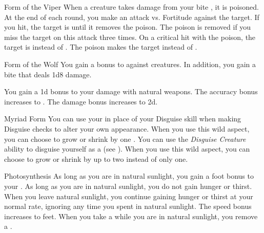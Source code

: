 {\begin{freeability}{Form of the Viper}
                \rankline
                 When a creature takes damage from your bite , it is poisoned.
                At the end of each round, you make an attack vs. Fortitude against the target.
                If you hit, the target is  until it removes the poison.
                The poison is removed if you miss the target on this attack three times.
                 On a critical hit with the poison, the target is  instead of .
                 The poison makes the target  instead of .
            \end{freeability}

            \begin{freeability}{Form of the Wolf}
                You gain a  bonus to  against  creatures.
                In addition, you gain a bite  that deals 1d8 damage.

                \rankline
                 You gain a \plus1d bonus to your damage with natural weapons.
                 The accuracy bonus increases to .
                 The damage bonus increases to \plus2d.
            \end{freeability}

            \begin{freeability}{Myriad Form}
                You can use your  in place of your Disguise skill when making Disguise checks to alter your own appearance.
                \rankline
                 When you use this wild aspect, you can choose to grow or shrink by one .
                 You can use the \textit{Disguise Creature} ability to disguise yourself as a  (see ).
                 When you use this wild aspect, you can choose to grow or shrink by up to two  instead of only one.
            \end{freeability}

            \begin{freeability}{Photosynthesis}
                As long as you are in natural sunlight, you gain a  foot bonus to your .
                \rankline
                 As long as you are in natural sunlight, you do not gain hunger or thirst.
                When you leave natural sunlight, you continue gaining hunger or thirst at your normal rate, ignoring any time you spent in natural sunlight.
                 The speed bonus increases to  feet.
                 When you take a  while you are in natural sunlight, you remove a .
            \end{freeability}

}
